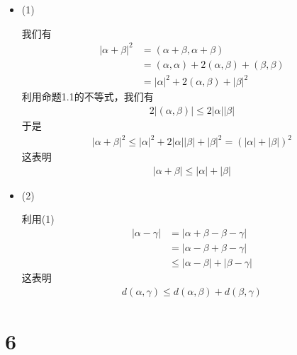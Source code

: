 \documentclass{article}
\begin{document}
\begin{itemize}
  \item (1)

        我们有
        \begin{align*}
          |\alpha + \beta|^2 & = (\alpha+\beta, \alpha+\beta)                         \\
                             & = (\alpha, \alpha) + 2(\alpha, \beta) + (\beta, \beta) \\
                             & = |\alpha|^2 + 2(\alpha, \beta) + |\beta|^2
        \end{align*}
        利用命题1.1的不等式，我们有
        \begin{align*}
          2|(\alpha, \beta)| \leq 2|\alpha| |\beta|
        \end{align*}
        于是
        \begin{align*}
          |\alpha + \beta|^2 \leq |\alpha|^2 + 2|\alpha| |\beta| + |\beta|^2 = (|\alpha| + |\beta|)^2
        \end{align*}
        这表明
        \begin{align*}
          |\alpha + \beta| \leq |\alpha| + |\beta|
        \end{align*}

  \item (2)

        利用(1)
        \begin{align*}
          |\alpha - \gamma| & = |\alpha + \beta - \beta - \gamma|      \\
                            & = |\alpha - \beta + \beta - \gamma|      \\
                            & \leq |\alpha - \beta| + |\beta - \gamma|
        \end{align*}
        这表明
        \begin{align*}
          d(\alpha, \gamma) \leq d(\alpha, \beta) + d(\beta, \gamma)
        \end{align*}
\end{itemize}

\section*{6}
\end{document}
